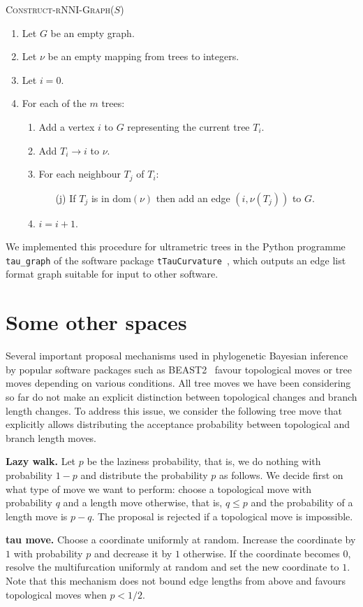 \documentclass{amsart}
\newcommand{\rnni}{\mathrm{rNNI}}
\newcommand{\dom}{\mathrm{dom}}
\begin{document}
\textsc{Construct-$\rnni$-Graph($S$)}
\begin{enumerate}[1.]
	\item Let $G$ be an empty graph.
	\item Let $\nu$ be an empty mapping from trees to integers.
	\item Let $i = 0$.
	\item For each of the $m$ trees: \vspace{-0.2em}
		\begin{enumerate}
			\item Add a vertex $i$ to $G$ representing the current tree $T_i$.
			\item Add $T_i \rightarrow i$ to $\nu$.
			\item For each neighbour $T_j$ of $T_i$:
				\begin{enumerate}
					\item[(j)] If $T_j$ is in $\dom(\nu)$ then add an edge $(i, \nu(T_j))$ to $G$.
				\end{enumerate}
		\item $i = i + 1$.
		\end{enumerate}
\end{enumerate}

We implemented this procedure for ultrametric trees in the Python programme \texttt{tau\_graph}
of the software package \texttt{tTauCurvature}~\cite{tTauCurvature},
which outputs an edge list format graph suitable for input to other software.

\section{Some other spaces}

Several important proposal mechanisms used in phylogenetic Bayesian inference by popular software packages such as BEAST2~\cite{beast2} favour topological moves or tree moves depending on various conditions.
All tree moves we have been considering so far do not make an explicit distinction between topological changes and branch length changes.
To address this issue, we consider the following tree move that explicitly allows distributing the acceptance probability between topological and branch length moves.

{\bf Lazy walk.}
Let $p$ be the laziness probability, that is, we do nothing with probability $1-p$ and distribute the probability $p$ as follows.
We decide first on what type of move we want to perform: choose a topological move with probability $q$ and a length move otherwise, that is, $q \leq p$ and the probability of a length move is $p-q$.
The proposal is rejected if a topological move is impossible.

{\bf tau move.}
Choose a coordinate uniformly at random.
Increase the coordinate by $1$ with probability $p$ and decrease it by $1$ otherwise.
If the coordinate becomes $0$, resolve the multifurcation uniformly at random and set the new coordinate to $1$.
Note that this mechanism does not bound edge lengths from above and favours topological moves when $p<1/2$.



\end{document}
